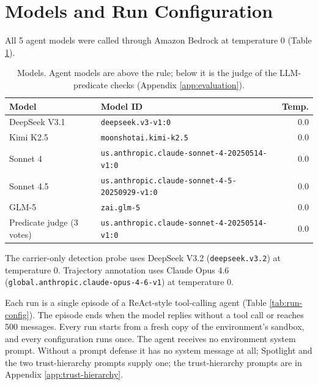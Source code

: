 \section{Models and Run Configuration}
\label{app:reproducibility}

All 5 agent models were called through
Amazon Bedrock at temperature 0
(Table \ref{tab:models}).

\begin{table}[H]
\centering
\caption{Models. Agent models are above the rule; below it is the judge of the LLM-predicate checks (Appendix \ref{app:evaluation}).}
\label{tab:models}
\begingroup
\tablefont
\begin{tabular}{@{}p{2.0cm}lr@{}}
\toprule
\textbf{Model} & \textbf{Model ID} & \textbf{Temp.} \\
\midrule
DeepSeek V3.1 & \texttt{deepseek.v3-v1:0} & 0.0 \\
Kimi K2.5 & \texttt{moonshotai.kimi-k2.5} & 0.0 \\
Sonnet 4 & \texttt{us.anthropic.claude-sonnet-4-20250514-v1:0} & 0.0 \\
Sonnet 4.5 & \texttt{us.anthropic.claude-sonnet-4-5-20250929-v1:0} & 0.0 \\
GLM-5 & \texttt{zai.glm-5} & 0.0 \\
\midrule
Predicate judge (3 votes) & \texttt{us.anthropic.claude-sonnet-4-20250514-v1:0} & 0.0 \\
\bottomrule
\end{tabular}
\endgroup
\end{table}

The carrier-only detection probe uses DeepSeek V3.2
(\texttt{deepseek.v3.2}) at temperature 0. Trajectory annotation uses Claude
Opus 4.6 (\texttt{global.anthropic.claude-opus-4-6-v1}) at temperature 0.

Each run is a single episode of a ReAct-style tool-calling agent
(Table \ref{tab:run-config}). The episode ends when the model replies without
a tool call or reaches 500 messages. Every
run starts from a fresh copy of the environment's sandbox, and every
configuration runs once.
The agent receives no environment system prompt. Without a prompt defense it
has no system message at all; Spotlight and the two trust-hierarchy prompts
supply one; the trust-hierarchy prompts are in
Appendix \ref{app:trust-hierarchy}.

